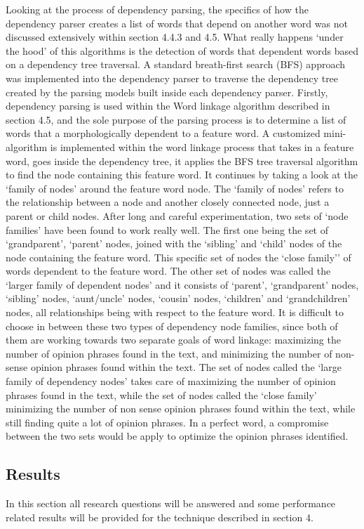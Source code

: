 \documentclass{sig-alternate}
\begin{document}
Looking at the process of dependency parsing, the specifics of how the dependency parser creates a list of words that depend on another word was not discussed extensively within section 4.4.3 and 4.5. What really happens `under the hood' of this algorithms is the detection of words that dependent words based on a dependency tree traversal. A standard breath-first search (BFS) approach was implemented into the dependency parser to traverse the dependency tree created by the parsing models built inside each dependency parser. Firstly, dependency parsing is used within the Word linkage algorithm described in section 4.5, and the sole purpose of the parsing process is to determine a list of words that a morphologically dependent to a feature word. A customized mini-algorithm is implemented within the word linkage process that takes in a feature word, goes inside the dependency tree, it applies the BFS tree traversal algorithm to find the node containing this feature word. It continues by taking a look at the `family of nodes' around the feature word node. The `family of nodes' refers to the relationship between a node and another closely connected node, just a parent or child nodes. After long and careful experimentation, two sets of `node families' have been found to work really well. The first one being the set of `grandparent', `parent' nodes, joined with the `sibling' and `child' nodes of the node containing the feature word. This specific set of nodes the `close family'' of words dependent to the feature word. The other set of nodes was called the `larger family of dependent nodes' and it consists of `parent', `grandparent' nodes, `sibling' nodes, `aunt/uncle' nodes, `cousin' nodes, `children' and `grandchildren' nodes, all relationships being with respect to the feature word. It is difficult to choose in between these two types of dependency node families, since both of them are working towards two separate goals of word linkage: maximizing the number of opinion phrases found in the text, and minimizing the number of non-sense opinion phrases found within the text. The set of nodes called the `large family of dependency nodes' takes care of maximizing the number of opinion phrases found in the text, while the set of nodes called the `close family' minimizing the number of non sense opinion phrases found within the text, while still finding quite a lot of opinion phrases. In a perfect word, a compromise between the two sets would be apply to optimize the opinion phrases identified. 

\subsection{Results}
In this section all research questions will be answered and some performance related results will be provided for the technique described in section 4. 
\end{document}
